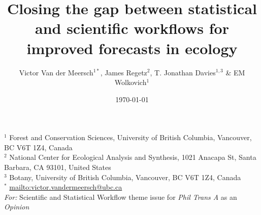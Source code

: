 \documentclass[11pt]{article}
\begin{document}
\title{Closing the gap between statistical and scientific workflows for improved forecasts in ecology } 
\date{\today}
\author{Victor Van der Meersch$^{1*}$, James Regetz$^{2}$, T. Jonathan Davies$^{1,3}$ \& EM Wolkovich$^{1}$}
\maketitle
\noindent $^{1}$ Forest and Conservation Sciences, University of British Columbia, Vancouver, BC V6T 1Z4, Canada\\
$^{2}$ National Center for Ecological Analysis and Synthesis, 1021 Anacapa St, Santa Barbara, CA 93101, United States\\
$^{3}$ Botany, University of British Columbia, Vancouver, BC V6T 1Z4, Canada \\
$^{*}$ \url{mailto:victor.vandermeersch@ubc.ca}\\

\noindent \emph{For:} Scientific and Statistical Workflow theme issue for \emph{Phil Trans A} as an \emph{Opinion}
\end{document}
